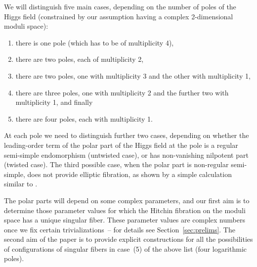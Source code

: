 \documentclass[10pt,a4paper]{amsart}
\numberwithin{equation}{section}
\begin{document}
We will distinguish five main cases, depending on the number of poles
of the Higgs field (constrained by our assumption having a complex
2-dimensional moduli space):
\begin{enumerate}\itemsep=0pt
\item[1)] there is one pole (which has to be of multiplicity 4),
\item[2)] there are two poles, each of multiplicity 2,
\item[3)] there are two poles, one with multiplicity 3 and the other with
multiplicity 1,
\item[4)] there are three poles, one with multiplicity 2 and the further two with multiplicity 1, and finally
\item[5)] there are four poles, each with multiplicity 1. %
\end{enumerate}
At each pole we need to distinguish further two cases, depending on
whether the leading-order term of the polar part of the Higgs field at
the pole is a regular semi-simple endomorphism (untwisted case), or
has non-vanishing nilpotent part (twisted case). {The third
 possible case, when the polar part is non-regular semi-simple, does
 not provide elliptic fibration, as shown by a simple
 calculation similar to \cite[Lemma~5.6]{ISS2}.}

The polar parts will depend on some complex parameters, and our {first} aim is
to determine those parameter values for which the Hitchin fibration on
the moduli space has a unique singular fiber. These parameter values
are complex numbers once we fix certain trivializations~-- for
details see Section~\ref{sec:prelims}.
The second aim of the paper is to provide explicit constructions for all the
possibilities of configurations of singular fibers in case~(5) of
the above list (four logarithmic poles).
\end{document}
